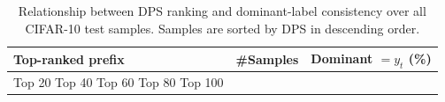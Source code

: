 \begin{table}[t]
\centering
\begin{tabular}{lrr}
\toprule
Top-ranked prefix & \#Samples & Dominant $= y_t$ (\%) \\
\midrule
Top 20%
Top 40%
Top 60%
Top 80%
Top 100%
\bottomrule
\caption{Relationship between DPS ranking and dominant-label consistency over all CIFAR-10 test samples. Samples are sorted by DPS in descending order.}
\label{tab:all_10000_prefix}
\end{tabular}
\end{table}
